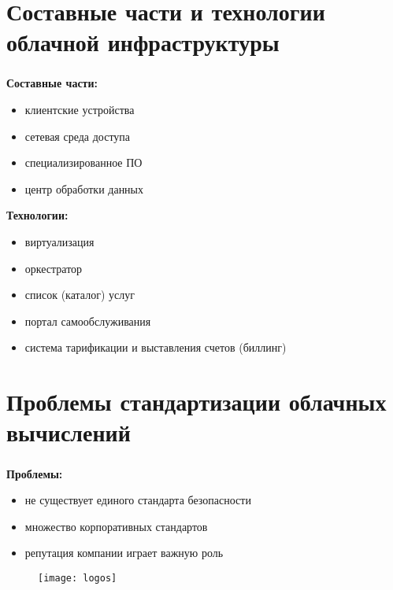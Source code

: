 
\section{Составные части и технологии облачной инфраструктуры}

\begin{frame}
\frametitle{\insertsection}

\textbf{Составные части:}
\begin{itemize}
    \item клиентские устройства
    \item сетевая среда доступа
    \item специализированное ПО
    \item центр обработки данных
\end{itemize}

\vspace{\baselineskip}

\textbf{Технологии:}
\begin{itemize}
    \item виртуализация
    \item оркестратор
    \item список (каталог) услуг
    \item портал самообслуживания
    \item система тарификации и выставления счетов (биллинг)
\end{itemize}
\end{frame}


\section{Проблемы стандартизации облачных вычислений}

\begin{frame}
\frametitle{\insertsection}

\textbf{Проблемы:}
\begin{itemize}
    \item не существует единого стандарта безопасности
    \item множество корпоративных стандартов
    \item репутация компании играет важную роль
\end{itemize}

\begin{figure}
    \center
    \texttt{[image: logos]}
\end{figure}
\end{frame}

